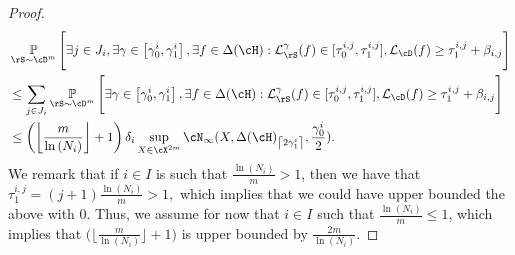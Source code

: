 \begin{proof}
    \begin{align}\label{eq:finalbound-1}
        &\p_{\rS\sim\cD^{m}}\Bigg[\exists j\in J_{i},
            \exists \gamma \in \left[\gamma_{0}^{i},\gamma_{1}^{i}\right]
            ,\exists f\in \dlh: 
            \ls_{\rS}^{\gamma}(f)\in [\tau_{0}^{i,j},\tau_{1}^{i,j}] 
            ,\ls_{\cD}(f) \geq \tau_{1}^{i,j} 
            + \beta_{i,j}
            \Bigg] \nonumber
            \\
            &\leq
            \sum_{j\in J_{i}}\p_{\rS\sim\cD^{m}}\Bigg[
            \exists \gamma \in \left[\gamma_{0}^{i},\gamma_{1}^{i}\right]
            ,\exists f\in \dlh: 
            \ls_{\rS}^{\gamma}(f)\in [\tau_{0}^{i,j},\tau_{1}^{i,j}] 
            ,\ls_{\cD}(f) \geq \tau_{1}^{i,j} 
            + \beta_{i,j}
            \Bigg]\nonumber
            \\
            &\leq \left(\left\lfloor\frac{m}{\ln{\left(N_{i} \right)}}\right\rfloor+1\right) \delta_{i}  \sup_{X\in \cX^{2m}}  \cN_{\infty}(X,\dlh_{\left\lceil2\gamma_{1}^{i}\right\rceil},\frac{\gamma_{0}^{i}}{2}) .
    \end{align}
    We remark that if $ i\in I $ is such that  $ \frac{\ln{\left(N_{i} \right)}}{m}>1 $, then we have that $ \tau_{1}^{i,j}=(j+1)\frac{\ln{\left(N_{i} \right)}}{m}>1,$ which implies that we could have upper bounded the above with $0$. Thus, we assume for now that $ i\in I $ such that  $ \frac{\ln{\left(N_{i} \right)}}{m}\leq1 $, which implies that $ \big(\big\lfloor\frac{m}{\ln{\left(N_{i} \right)}}\big\rfloor+1\big) $ is upper bounded by $ \frac{2m}{\ln{\left(N_{i} \right)}} $.


\end{proof}

